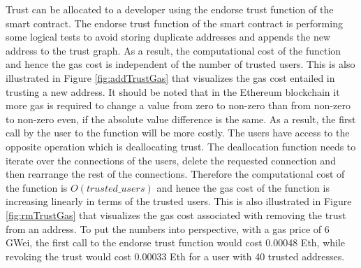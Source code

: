 {{{Trust can be allocated to a developer using the endorse trust function of the smart contract. The endorse trust function of the smart contract is performing some logical tests to avoid storing duplicate addresses and appends the new address to the trust graph. As a result, the computational cost of the function and hence the gas cost is independent of the number of trusted users. This is also illustrated in Figure \ref{fig:addTrustGas} that visualizes the gas cost entailed in trusting a new address. It should be noted that in the Ethereum blockchain it more gas is required to change a value from zero to non-zero than from non-zero to non-zero even, if the absolute value difference is the same. As a result, the first call by the user to the function will be more costly. The users have access to the opposite operation which is deallocating trust. The deallocation function needs to iterate over the connections of the users, delete the requested connection and then rearrange the rest of the connections. Therefore the computational cost of the function is $O(trusted\_users)$  and hence the gas cost of the function is increasing linearly in terms of the trusted users. This is also illustrated in Figure \ref{fig:rmTrustGas} that visualizes the gas cost associated with removing the trust from an address. To put the numbers into perspective, with a gas price of 6 GWei, the first call to the endorse trust function would cost 0.00048 Eth, while revoking the trust would cost 0.00033 Eth for a user with 40 trusted addresses.

}}}
